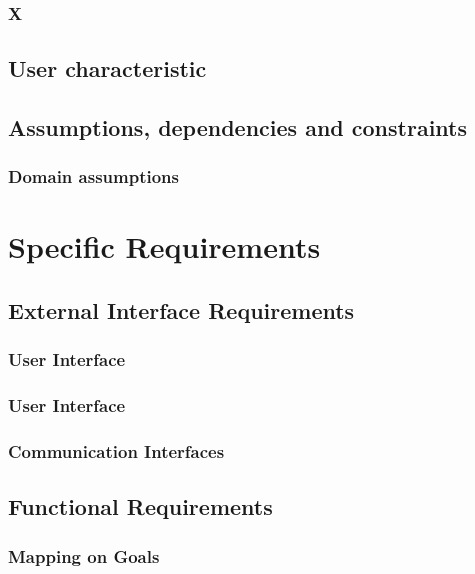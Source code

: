 \documentclass{article}
\begin{document}
\subsubsection{X}

\subsection{User characteristic}

\subsection{Assumptions, dependencies and constraints}

\subsubsection{Domain assumptions}

\section{Specific Requirements }

\subsection{External Interface Requirements }

\subsubsection{User Interface}

\subsubsection{User Interface}

\subsubsection{Communication Interfaces}

\subsection{Functional Requirements}

\subsubsection{Mapping on Goals}
\end{document}
